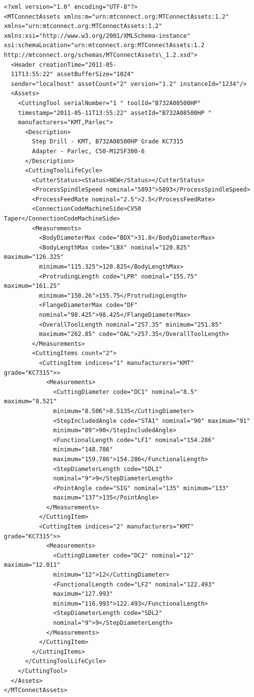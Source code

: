 \documentclass{mtconnect}	%
\begin{document}
\begin{lstlisting}[firstnumber=1,escapechar=|,% 
caption={Example for Step Mill Side View}, label={lst:step-drill-side-view}]
<?xml version="1.0" encoding="UTF-8"?>
<MTConnectAssets xmlns:m="urn:mtconnect.org:MTConnectAssets:1.2" 
xmlns="urn:mtconnect.org:MTConnectAssets:1.2" 
xmlns:xsi="http://www.w3.org/2001/XMLSchema-instance" 
xsi:schemaLocation="urn:mtconnect.org:MTConnectAssets:1.2 
http://mtconnect.org/schemas/MTConnectAssets\_1.2.xsd">
  <Header creationTime="2011-05-
  11T13:55:22" assetBufferSize="1024" 
  sender="localhost" assetCount="2" version="1.2" instanceId="1234"/>
  <Assets>
    <CuttingTool serialNumber="1 " toolId="B732A08500HP" 
    timestamp="2011-05-11T13:55:22" assetId="B732A08500HP " 
    manufacturers="KMT,Parlec">
      <Description>
        Step Drill - KMT, B732A08500HP Grade KC7315
        Adapter - Parlec, C50-M12SF300-6
      </Description>
      <CuttingToolLifeCycle>
        <CutterStatus><Status>NEW</Status></CutterStatus>
        <ProcessSpindleSpeed nominal="5893">5893</ProcessSpindleSpeed>
        <ProcessFeedRate nominal="2.5">2.5</ProcessFeedRate>
        <ConnectionCodeMachineSide>CV50 Taper</ConnectionCodeMachineSide>
        <Measurements>
          <BodyDiameterMax code="BDX">31.8</BodyDiameterMax>
          <BodyLengthMax code="LBX" nominal="120.825" maximum="126.325" 
          minimum="115.325">120.825</BodyLengthMax>
          <ProtrudingLength code="LPR" nominal="155.75" maximum="161.25" 
          minimum="150.26">155.75</ProtrudingLength>
          <FlangeDiameterMax code="DF" 
          nominal="98.425">98.425</FlangeDiameterMax>
          <OverallToolLength nominal="257.35" minimum="251.85" 
          maximum="262.85" code="OAL">257.35</OverallToolLength>
        </Measurements>
        <CuttingItems count="2">
          <CuttingItem indices="1" manufacturers="KMT" grade="KC7315">>
            <Measurements>
              <CuttingDiameter code="DC1" nominal="8.5" maximum="8.521" 
              minimum="8.506">8.5135</CuttingDiameter>
              <StepIncludedAngle code="STA1" nominal="90" maximum="91" 
              minimum="89">90</StepIncludedAngle>
              <FunctionalLength code="LF1" nominal="154.286" 
              minimum="148.786" 
              maximum="159.786">154.286</FunctionalLength>
              <StepDiameterLength code="SDL1" 
              nominal="9">9</StepDiameterLength>
              <PointAngle code="SIG" nominal="135" minimum="133" 
              maximum="137">135</PointAngle>
            </Measurements>
          </CuttingItem>
          <CuttingItem indices="2" manufacturers="KMT" grade="KC7315">>
            <Measurements>
              <CuttingDiameter code="DC2" nominal="12" maximum="12.011" 
              minimum="12">12</CuttingDiameter>
              <FunctionalLength code="LF2" nominal="122.493" 
              maximum="127.993" 
              minimum="116.993">122.493</FunctionalLength>
              <StepDiameterLength code="SDL2" 
              nominal="9">9</StepDiameterLength>
            </Measurements>
          </CuttingItem>
        </CuttingItems>
      </CuttingToolLifeCycle>
    </CuttingTool>
  </Assets>
</MTConnectAssets>
\end{lstlisting}
\end{document}
